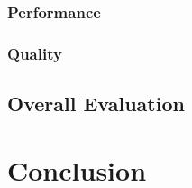 \documentclass{l4proj}
\begin{document}
\subsection{Performance}
\subsection{Quality}






\section{Overall Evaluation}


\chapter{Conclusion}












\end{document}
